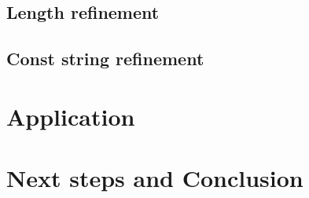 \documentclass[runningheads]{llncs}
\begin{document}
{\subsection{Length refinement}

\subsection{Const string refinement}

\section{Application}

\section{Next steps and Conclusion}
}



\end{document}
